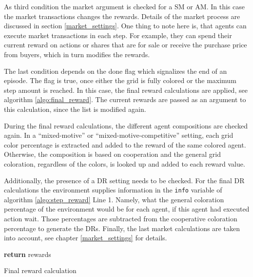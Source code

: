 As third condition the market argument is checked for a SM or AM. In this case the market transactions changes the rewards. Details of the market process are discussed in section \ref{market_settings}. One thing to note here is, that agents can execute market transactions in each step. For example, they can spend their current reward on actions or shares that are for sale or receive the purchase price from buyers, which in turn modifies the rewards.

The last condition depends on the done flag which signalizes the end of an episode. The flag is true, once either the grid is fully colored or the maximum step amount is reached. In this case, the final reward calculations are applied, see algorithm \ref{algo:final_reward}. The current rewards are passed as an argument to this calculation, since the list is modified again.

During the final reward calculations, the different agent compositions are checked again. In a ``mixed-motive'' or ``mixed-motive-competitive'' setting, each grid color percentage is extracted and added to the reward of the same colored agent. Otherwise, the composition is based on cooperation and the general grid coloration, regardless of the colors, is looked up and added to each reward value. 


Additionally, the presence of a DR setting needs to be checked. For the final DR calculations the environment supplies information in the \verb|info| variable of algorithm \ref{algo:step_reward} Line 1. Namely, what the general coloration percentage of the environment would be for each agent, if this agent had executed action wait. Those percentages are subtracted from the cooperative coloration percentage to generate the DRs. Finally, the last market calculations are taken into account, see chapter \ref{market_settings} for details.

\begin{algorithm}[H]
    \DontPrintSemicolon
    \;
    \;
    \textbf{return} rewards\;
    \caption{Final reward calculation}\label{algo:final_reward}
\end{algorithm}

